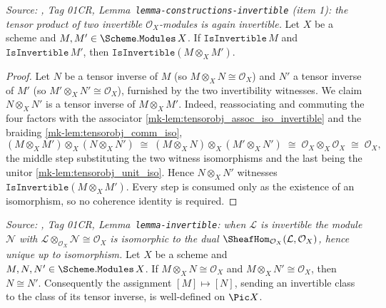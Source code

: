 \begin{lemma}\label{mk-lem:isinvertible_tensor}

  \textit{Source: \cite{stacks-project}, Tag 01CR,
  Lemma~\texttt{lemma-constructions-invertible} (item 1): the tensor product of two
  invertible \(\mathcal{O}_X\)-modules is again invertible.}
  Let \(X\) be a scheme and \(M, M' \in \Scheme.\mathtt{Modules}\,X\). If
  \(\mathtt{IsInvertible}\,M\) and \(\mathtt{IsInvertible}\,M'\), then
  \(\mathtt{IsInvertible}(M \otimes_X M')\).
\end{lemma}

\begin{proof}
  Let \(N\) be a tensor inverse of \(M\) (so \(M \otimes_X N \cong \mathcal{O}_X\))
  and \(N'\) a tensor inverse of \(M'\) (so \(M' \otimes_X N' \cong \mathcal{O}_X\)),
  furnished by the two invertibility witnesses. We claim \(N \otimes_X N'\) is a
  tensor inverse of \(M \otimes_X M'\). Indeed, reassociating and commuting the four
  factors with the associator \ref{mk-lem:tensorobj_assoc_iso_invertible} and the
  braiding \ref{mk-lem:tensorobj_comm_iso},
  \[
    (M \otimes_X M') \otimes_X (N \otimes_X N')
    \;\cong\;
    (M \otimes_X N) \otimes_X (M' \otimes_X N')
    \;\cong\;
    \mathcal{O}_X \otimes_X \mathcal{O}_X
    \;\cong\;
    \mathcal{O}_X,
  \]
  the middle step substituting the two witness isomorphisms and the last being the
  unitor \ref{mk-lem:tensorobj_unit_iso}. Hence \(N \otimes_X N'\) witnesses
  \(\mathtt{IsInvertible}(M \otimes_X M')\). Every step is consumed only as the
  existence of an isomorphism, so no coherence identity is required.
\end{proof}

\begin{lemma}\label{mk-lem:isinvertible_inverse_welldef}

  \textit{Source: \cite{stacks-project}, Tag 01CR, Lemma~\texttt{lemma-invertible}: when
  \(\mathcal{L}\) is invertible the module \(\mathcal{N}\) with
  \(\mathcal{L} \otimes_{\mathcal{O}_X} \mathcal{N} \cong \mathcal{O}_X\) is
  isomorphic to the dual \(\SheafHom_{\mathcal{O}_X}(\mathcal{L}, \mathcal{O}_X)\),
  hence unique up to isomorphism.}
  Let \(X\) be a scheme and \(M, N, N' \in \Scheme.\mathtt{Modules}\,X\). If
  \(M \otimes_X N \cong \mathcal{O}_X\) and \(M \otimes_X N' \cong \mathcal{O}_X\),
  then \(N \cong N'\). Consequently the assignment \([M] \mapsto [N]\), sending an
  invertible class to the class of its tensor inverse, is well-defined on
  \(\Pic X\).
\end{lemma}

